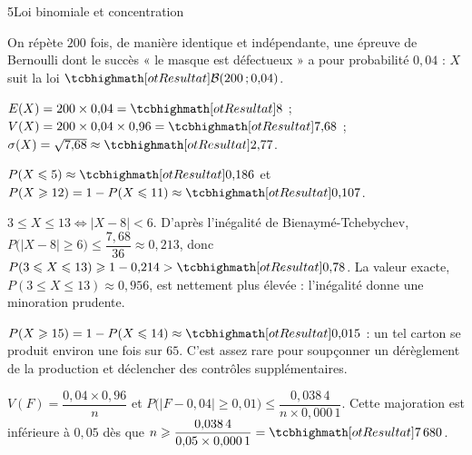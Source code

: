 \begin{corrigeBac}{5}{Loi binomiale et concentration}
\begin{questions}
  \item On répète $200$ fois, de manière identique et indépendante, une épreuve de Bernoulli dont le succès « le masque est
    défectueux » a pour probabilité $0{,}04$ : $X$ suit la loi $\res{\mathcal{B}(200\pv0{,}04)}$. 
  \item $E(X)=200\times0{,}04=\res{8}$ ; $V(X)=200\times0{,}04\times0{,}96=\res{7{,}68}$ ; $\sigma(X)=\sqrt{7{,}68}\approx\res{2{,}77}$. 
  \item $P(X\leq5)\approx\res{0{,}186}$ et $P(X\geq12)=1-P(X\leq11)\approx\res{0{,}107}$. \pts{1 pt}
  \item $3\leq X\leq13\iff|X-8|<6$. D'après l'inégalité de Bienaymé-Tchebychev,
    $P\big(|X-8|\geq6\big)\leq\dfrac{7{,}68}{36}\approx0{,}213$, donc $P(3\leq X\leq13)\geq1-0{,}214>\res{0{,}78}$. La valeur exacte,
    $P(3\leq X\leq13)\approx0{,}956$, est nettement plus élevée : l'inégalité donne une minoration prudente. \pts{1 pt}
  \item $P(X\geq15)=1-P(X\leq14)\approx\res{0{,}015}$ : un tel carton se produit environ une fois sur $65$. C'est assez rare pour
    soupçonner un dérèglement de la production et déclencher des contrôles supplémentaires. 
  \item $V(F)=\dfrac{0{,}04\times0{,}96}{n}$ et $P\big(|F-0{,}04|\geq0{,}01\big)\leq\dfrac{0{,}038\,4}{n\times0{,}000\,1}$. Cette majoration
    est inférieure à $0{,}05$ dès que $n\geq\dfrac{0{,}038\,4}{0{,}05\times0{,}000\,1}=\res{7\,680}$. \pts{1 pt}
\end{questions}
\end{corrigeBac}

